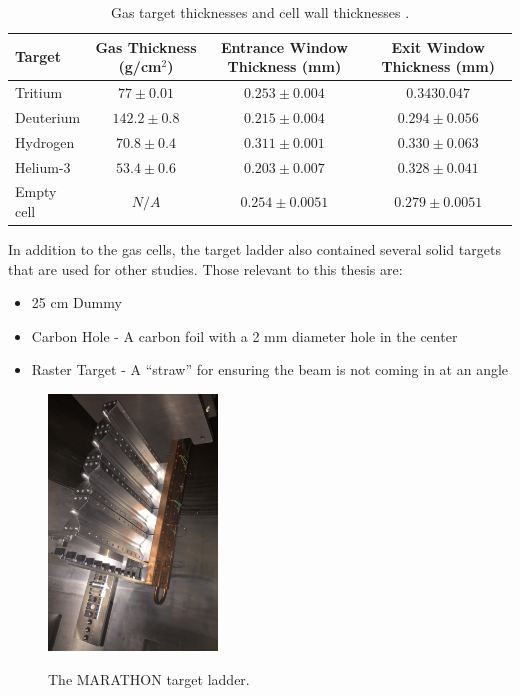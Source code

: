 \begin{table}[h]
\begin{tabular}{|l|c|c|c|}
\hline
Target & Gas Thickness (g/cm$^2$) & Entrance Window Thickness (mm) & Exit Window Thickness (mm) \\
\hline
\hline
Tritium & $77\pm0.01$ & $0.253\pm0.004$ & $0.3430.047$\\ \hline
Deuterium & $142.2\pm0.8$ & $0.215\pm0.004$ & $0.294\pm0.056$\\ \hline
Hydrogen & $70.8\pm0.4$ & $0.311\pm0.001$ & $0.330\pm0.063$\\ \hline
Helium-3 & $53.4\pm0.6$ & $0.203\pm0.007$ & $0.328\pm0.041$\\ \hline
Empty cell & $N/A$ & $0.254\pm0.0051$ & $0.279\pm0.0051$\\ \hline
\end{tabular}
\caption{Gas target thicknesses and cell wall thicknesses \cite{targ_meas}.}
\label{tbl:gas_targs}
\end{table}

In addition to the gas cells, the target ladder also contained several solid targets that are used for other studies. Those relevant to this thesis are:
\begin{itemize}
	\item 25 cm Dummy
	\item Carbon Hole - A carbon foil with a 2 mm diameter hole in the center
	\item Raster Target - A ``straw'' for ensuring the beam is not coming in at an angle
\end{itemize}

\begin{figure}[h]
\begin{center}
	\includegraphics[width=0.4\textwidth]{./setup/fig/target.png}
	\label{fig:target}
	\caption{The MARATHON target ladder.}
\end{center}
\end{figure}

